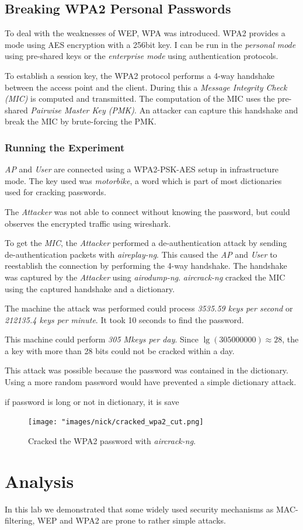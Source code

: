 \documentclass[12pt,a4paper]{article}
\begin{document}
 \subsection{Breaking WPA2 Personal Passwords}
	 To deal with the weaknesses of WEP, WPA was introduced. WPA2 provides a mode using AES encryption with a 256bit key. I can be run in the \emph{personal mode} using pre-shared keys or the \emph{enterprise mode} using authentication protocols.
	 
	 To establish a session key, the WPA2 protocol performs a 4-way handshake between the access point and the client. During this a \emph{Message Integrity Check (MIC)} is computed and transmitted. The computation of the MIC uses the pre-shared \emph{Pairwise Master Key (PMK)}. An attacker can capture this handshake and break the MIC by brute-forcing the PMK.
	 
	\subsubsection{Running the Experiment}
		\emph{AP} and \emph{User} are connected using a WPA2-PSK-AES setup in infrastructure mode. The key used was \emph{motorbike}, a word which is part of most dictionaries used for cracking passwords.
		 
		 The \emph{Attacker} was not able to connect without knowing the password, but could observes the encrypted traffic using wireshark.
		 
		 To get the \emph{MIC}, the \emph{Attacker} performed a de-authentication attack by sending de-authentication packets with \emph{aireplay-ng}.
		 This caused the \emph{AP} and \emph{User} to reestablish the connection by performing the 4-way handshake.
		 The handshake was captured by the \emph{Attacker} using \emph{airodump-ng}.
		 \emph{aircrack-ng} cracked the MIC using the captured handshake and a dictionary.
		
		 The machine the attack was performed could process \emph{3535.59 keys per second} or \emph{212135.4 keys per minute}. It took 10 seconds to find the password.
		 
		 This machine could perform \emph{305 Mkeys per day}.
		 Since $\lg(305000000) \approx 28$, the a key with more than 28 bits could not be cracked within a day.
		 
		 This attack was possible because the password was contained in the dictionary. Using a more random password would have prevented a simple dictionary attack.
	
	if password is long or not in dictionary, it is save
	\begin{figure}
		\texttt{[image: "images/nick/cracked\_wpa2\_cut.png]}
		\caption{Cracked the WPA2 password with \emph{aircrack-ng}.}
		\label{wpa:crack}
	\end{figure}

\section{Analysis}
	In this lab we demonstrated that some widely used security mechanisms as MAC-filtering, WEP and WPA2 are prone to rather simple attacks.




\end{document}
